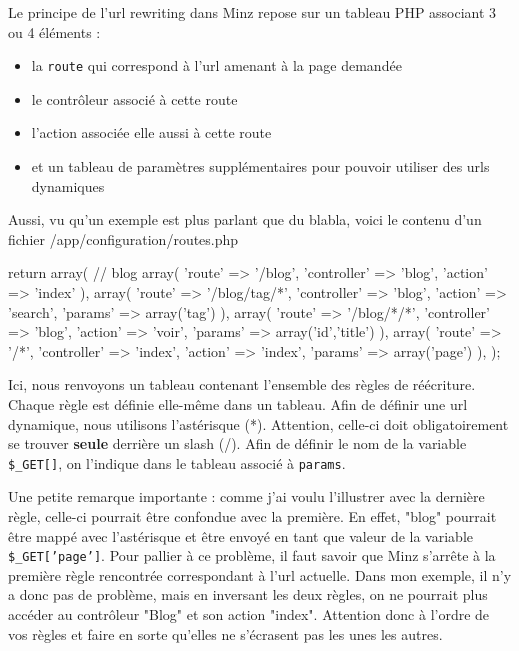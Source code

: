 \documentclass[a4paper,11pt]{article}
\begin{document}
Le principe de l'url rewriting dans Minz repose sur un tableau PHP associant 3 ou 4 éléments :
\begin{itemize}
  \item la \texttt{route} qui correspond à l'url amenant à la page demandée
  \item le contrôleur associé à cette route
  \item l'action associée elle aussi à cette route
  \item et un tableau de paramètres supplémentaires pour pouvoir utiliser des urls dynamiques
\end{itemize}

Aussi, vu qu'un exemple est plus parlant que du blabla, voici le contenu d'un fichier /app/configuration/routes.php
\begin{PHP}
return array(
  // blog
  array(
    'route'       => '/blog',
    'controller'  => 'blog',
    'action'      => 'index'
  ),
  array(
    'route'       => '/blog/tag/*',
    'controller'  => 'blog',
    'action'      => 'search',
    'params'      => array('tag')
  ),
  array(
    'route'       => '/blog/*/*',
    'controller'  => 'blog',
    'action'      => 'voir',
    'params'      => array('id','title')
  ),
  array(
    'route'       => '/*',
    'controller'  => 'index',
    'action'      => 'index',
    'params'      => array('page')
    ),
);
\end{PHP}

Ici, nous renvoyons un tableau contenant l'ensemble des règles de réécriture. Chaque règle est définie elle-même dans un tableau. Afin de définir une url dynamique, nous utilisons l'astérisque (*). Attention, celle-ci doit obligatoirement se trouver \textbf{seule} derrière un slash (/). Afin de définir le nom de la variable \texttt{\$\_GET[]}, on l'indique dans le tableau associé à \texttt{params}.

Une petite remarque importante : comme j'ai voulu l'illustrer avec la dernière règle, celle-ci pourrait être confondue avec la première. En effet, "blog" pourrait être mappé avec l'astérisque et être envoyé en tant que valeur de la variable \texttt{\$\_GET['page']}. Pour pallier à ce problème, il faut savoir que Minz s'arrête à la première règle rencontrée correspondant à l'url actuelle. Dans mon exemple, il n'y a donc pas de problème, mais en inversant les deux règles, on ne pourrait plus accéder au contrôleur "Blog" et son action "index". Attention donc à l'ordre de vos règles et faire en sorte qu'elles ne s'écrasent pas les unes les autres.\\
\end{document}
